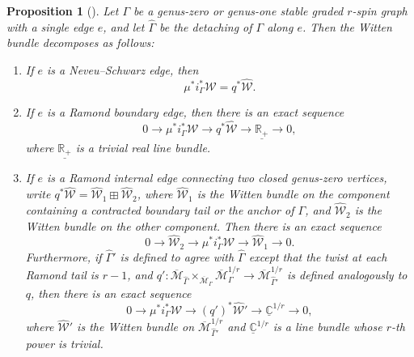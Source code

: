 \documentclass[11pt]{amsart}
\newtheorem{pr}[dummy]{Proposition}
\theoremstyle{definition}
\theoremstyle{remark}
\newcommand{\<}{\left<}
\renewcommand{\>}{\right>}
\numberwithin{equation}{section}
\def\Mbar{{\overline{\mathcal M}}}
\begin{document}
\begin{pr}[{\cite[Proposition 2.20]{TZ1}}]
\label{prop decomposition}
Let $\Gamma$ be a genus-zero or genus-one stable graded $r$-spin graph with a single edge $e$, and let $\widehat{\Gamma}$ be the detaching of $\Gamma$ along $e$.  Then the Witten bundle decomposes as follows:
\begin{enumerate}
\item\label{it NS} If $e$ is a Neveu--Schwarz edge, then \begin{equation}\label{eq NSdecompses}
\mu^*i_{\Gamma}^*{\mathcal{W}} = q^*\widehat{{\mathcal{W}}}.
\end{equation}

\item\label{it decompose Ramond boundary edge} If $e$ is a Ramond boundary edge, then there is an exact sequence
\begin{equation}
\label{eq decompose}0 \to \mu^*i_{\Gamma}^*{\mathcal{W}} \to q^*\widehat{{\mathcal{W}}} \to \underline{\mathbb{R}_+} \to 0,
\end{equation}
where $\underline{\mathbb{R}_+}$ is a trivial real line bundle.

\item If $e$ is a Ramond internal edge connecting two closed genus-zero vertices, write $q^*\widehat{\mathcal{W}} = \widehat{\mathcal{W}}_1 \boxplus \widehat{\mathcal{W}}_2$, where $\widehat{\mathcal{W}}_1$ is the Witten bundle on the component containing a contracted boundary tail or the anchor of $\Gamma$, and $\widehat{\mathcal{W}}_2$ is the Witten bundle on the other component.  Then there is an exact sequence
\begin{equation}
\label{eq decompose2}
0 \to \widehat{\mathcal{W}}_2 \to \mu^*i_{\Gamma}^*{\mathcal{W}} \to \widehat{\mathcal{W}}_1 \to 0.
\end{equation}
Furthermore, if $\widehat\Gamma'$ is defined to agree with $\widehat\Gamma$ except that the twist at each Ramond tail is $r-1$, and $q': \Mbar_{\widehat{\Gamma}} \times_{\Mbar_{\Gamma}} \Mbar_{\Gamma}^{1/r} \to \Mbar_{\widehat\Gamma'}^{1/r}$ is defined analogously to $q$, then there is an exact sequence
\begin{equation}
\label{eq decompose3}
0 \to \mu^*i_{\Gamma}^*{\mathcal{W}} \to (q')^*\widehat{{\mathcal{W}}}' \to {\underline{\mathbb{C}}}^{1/r} \to 0,
\end{equation}
where $\widehat{{\mathcal{W}}}'$ is the Witten bundle on $\Mbar_{\widehat\Gamma'}^{1/r}$ and ${\underline{\mathbb{C}}}^{1/r}$ is a line bundle whose $r$-th power is trivial.


\end{enumerate}
\end{pr}
\end{document}
